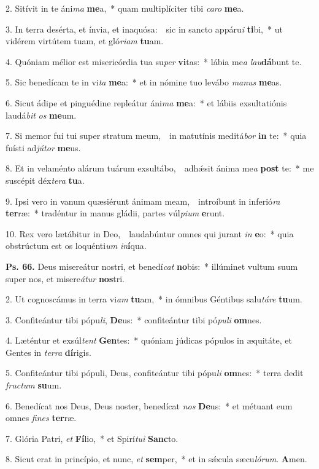 
2. Sitívit in te áni\textit{ma} \textbf{me}a,~* quam multiplíciter tibi \textit{ca}\textit{ro} \textbf{me}a.

3. In terra desérta, et ínvia, et inaquósa:~\GreDagger\ sic in sancto appáru\textit{i} \textbf{ti}bi,~* ut vidérem virtútem tuam, et gló\textit{ri}\textit{am} \textbf{tu}am.

4. Quóniam mélior est misericórdia tua su\textit{per} \textbf{vi}tas:~* lábia me\textit{a} \textit{lau}\textbf{dá}bunt te.

5. Sic benedícam te in vi\textit{ta} \textbf{me}a:~* et in nómine tuo levábo \textit{ma}\textit{nus} \textbf{me}as.

6. Sicut ádipe et pinguédine repleátur áni\textit{ma} \textbf{me}a:~* et lábiis exsultatiónis laudá\textit{bit} \textit{os} \textbf{me}um.

7. Si memor fui tui super stratum meum,~\GreDagger\ in matutínis meditá\textit{bor} \textbf{in} te:~* quia fuísti ad\textit{jú}\textit{tor} \textbf{me}us.

8. Et in velaménto alárum tuárum exsultábo,~\GreDagger\ adh\'{\ae}sit ánima me\textit{a} \textbf{post} te:~* me suscépit déx\textit{te}\textit{ra} \textbf{tu}a.

9. Ipsi vero in vanum quæsiérunt ánimam meam,~\GreDagger\ introíbunt in inferió\textit{ra} \textbf{ter}ræ:~* tradéntur in manus gládii, partes vúl\textit{pi}\textit{um} \textbf{e}runt.

10. Rex vero lætábitur in Deo,~\GreDagger\ laudabúntur omnes qui jurant \textit{in} \textbf{e}o:~* quia obstrúctum est os loquénti\textit{um} \textit{in}\textbf{í}qua.

\textbf{Ps. 66.} Deus misereátur nostri, et benedí\textit{cat} \textbf{no}bis:~* illúminet vultum suum super nos, et misere\textit{átur} \textbf{nos}tri.

2. Ut cognoscámus in terra vi\textit{am} \textbf{tu}am,~* in ómnibus Géntibus salu\textit{tá}\textit{re} \textbf{tu}um.

3. Confiteántur tibi pópu\textit{li}, \textbf{De}us:~* confiteántur tibi pó\textit{pu}\textit{li} \textbf{om}nes.

4. Læténtur et exsúl\textit{tent} \textbf{Gen}tes:~* quóniam júdicas pópulos in æquitáte, et Gentes in \textit{ter}\textit{ra} \textbf{dí}rigis.

5. Confiteántur tibi pópuli, Deus, confiteántur tibi pópu\textit{li} \textbf{om}nes:~* terra dedit \textit{fruc}\textit{tum} \textbf{su}um.

6. Benedícat nos Deus, Deus noster, benedícat \textit{nos} \textbf{De}us:~* et métuant eum omnes \textit{fi}\textit{nes} \textbf{ter}ræ.

7. Glória Patri, \textit{et} \textbf{Fí}lio,~* et Spirí\textit{tu}\textit{i} \textbf{Sanc}to.

8. Sicut erat in princípio, et nunc, \textit{et} \textbf{sem}per,~* et in s\'{\ae}cula sæcu\textit{ló}\textit{rum}. \textbf{A}men.